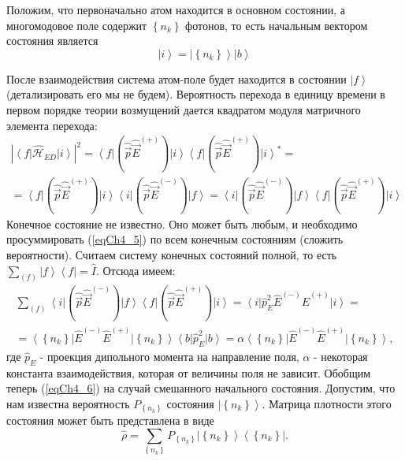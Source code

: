 Положим, что первоначально атом находится в основном состоянии, а
многомодовое поле содержит $\left\{n_k\right\}$ фотонов, то есть начальным
вектором состояния является 
\begin{equation}
\left|i\right> = \left|\left\{n_k\right\}\right> \left|b\right>
\label{eqCh4_4}
\end{equation}

После взаимодействия система атом-поле будет находится в состоянии
$\left|f\right>$ (детализировать его мы не будем). Вероятность
перехода в единицу времени в первом порядке теории возмущений дается 
квадратом модуля матричного элемента перехода: 
\begin{eqnarray}
\left|\left<f\right|\hat{\mathcal{H}}_{ED}\left|i\right>\right|^2 =
\left<f\right|\left(\hat{\vec{p}}\hat{\vec{E}}^{(+)}\right)\left|i\right>
\left<f\right|\left(\hat{\vec{p}}\hat{\vec{E}}^{(+)}\right)\left|i\right>^{*}
= 
\nonumber \\
=
\left<f\right|\left(\hat{\vec{p}}\hat{\vec{E}}^{(+)}\right)\left|i\right>
\left<i\right|\left(\hat{\vec{p}}\hat{\vec{E}}^{(-)}\right)\left|f\right>
=
\left<i\right|\left(\hat{\vec{p}}\hat{\vec{E}}^{(-)}\right)\left|f\right>
\left<f\right|\left(\hat{\vec{p}}\hat{\vec{E}}^{(+)}\right)\left|i\right>
\label{eqCh4_5}
\end{eqnarray}
Конечное состояние не известно. Оно может быть любым, и необходимо
просуммировать (\ref{eqCh4_5}) по всем конечным состояниям (сложить
вероятности). Считаем систему конечных состояний полной, то есть  
$\sum_{(f)} \left|f\right>\left<f\right| = \hat{I}$.
Отсюда имеем: 
\begin{eqnarray}
\sum_{(f)}
\left<i\right|\left(\hat{\vec{p}}\hat{\vec{E}}^{(-)}\right)\left|f\right>
\left<f\right|\left(\hat{\vec{p}}\hat{\vec{E}}^{(+)}\right)\left|i\right>
= 
\left<i\right|\hat{p}_E^2\hat{E}^{(-)}\hat{E}^{(+)}\left|i\right> = 
\nonumber \\
=
\left<\left\{n_k\right\}\right|\hat{E}^{(-)}\hat{E}^{(+)}\left|\left\{n_k\right\}\right>\left<b\right|\hat{p}_E^2\left|b\right>
= 
\alpha \left<\left\{n_k\right\}\right|\hat{E}^{(-)}\hat{E}^{(+)}\left|\left\{n_k\right\}\right>,
\label{eqCh4_6}
\end{eqnarray}
где $\hat{p}_E$ -  проекция дипольного момента на направление поля,
$\alpha$ - некоторая константа взаимодействия, которая от величины
поля не зависит. Обобщим теперь (\ref{eqCh4_6}) на случай смешанного
начального состояния. Допустим, что нам известна вероятность
$P_{\left\{n_k\right\}}$ состояния  $\left|\left\{n_k\right\}\right>$.
Матрица плотности этого состояния может быть представлена в виде 
\begin{equation}
\hat{\rho} = \sum_{\left\{n_k\right\}}P_{\left\{n_k\right\}}
\left|\left\{n_k\right\}\right>\left<\left\{n_k\right\}\right|.
\label{eqCh4_7}
\end{equation}

